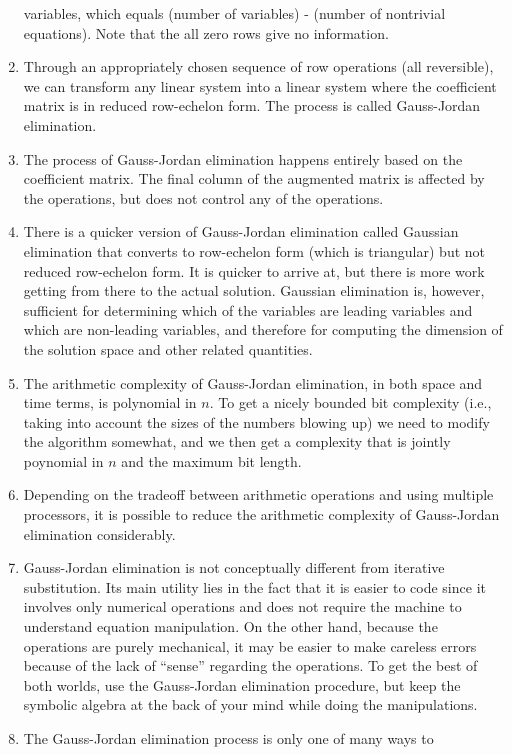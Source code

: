 \documentclass[10pt]{amsart}
\begin{document}
\begin{enumerate}
  variables, which equals (number of variables) - (number of
  nontrivial equations). Note that the all zero rows give no
  information.
\item Through an appropriately chosen sequence of row operations (all
  reversible), we can transform any linear system into a linear system
  where the coefficient matrix is in reduced row-echelon form. The
  process is called Gauss-Jordan elimination.
\item The process of Gauss-Jordan elimination happens entirely based
  on the coefficient matrix. The final column of the augmented matrix
  is affected by the operations, but does not control any of the
  operations.
\item There is a quicker version of Gauss-Jordan elimination called
  Gaussian elimination that converts to row-echelon form (which is
  triangular) but not reduced row-echelon form. It is quicker to
  arrive at, but there is more work getting from there to the actual
  solution. Gaussian elimination is, however, sufficient for
  determining which of the variables are leading variables and which
  are non-leading variables, and therefore for computing the dimension
  of the solution space and other related quantities.
\item The arithmetic complexity of Gauss-Jordan elimination, in both
  space and time terms, is polynomial in $n$. To get a nicely bounded
  bit complexity (i.e., taking into account the sizes of the numbers
  blowing up) we need to modify the algorithm somewhat, and we then
  get a complexity that is jointly poynomial in $n$ and the maximum
  bit length.
\item Depending on the tradeoff between arithmetic operations and
  using multiple processors, it is possible to reduce the arithmetic
  complexity of Gauss-Jordan elimination considerably.
\item Gauss-Jordan elimination is not conceptually different from
  iterative substitution. Its main utility lies in the fact that it is
  easier to code since it involves only numerical operations and does
  not require the machine to understand equation manipulation. On the
  other hand, because the operations are purely mechanical, it may be
  easier to make careless errors because of the lack of ``sense''
  regarding the operations. To get the best of both worlds, use the
  Gauss-Jordan elimination procedure, but keep the symbolic algebra at
  the back of your mind while doing the manipulations.
\item The Gauss-Jordan elimination process is only one of many ways to

\end{enumerate}
\end{document}
